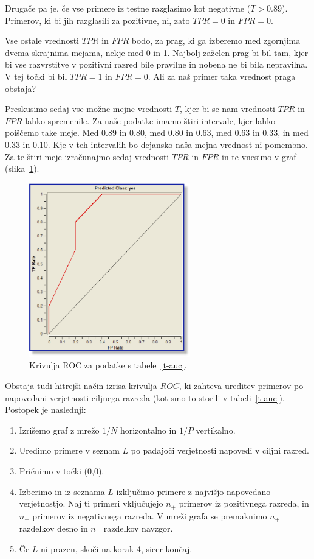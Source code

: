 Drugače pa je, če vse primere iz testne razglasimo kot negativne ($T>0.89$). Primerov, ki bi jih razglasili za pozitivne, ni, zato $TPR=0$ in $FPR=0$.

Vse ostale vrednosti $TPR$ in $FPR$ bodo, za prag, ki ga izberemo med zgornjima dvema skrajnima mejama, nekje med 0 in 1. Najbolj zaželen prag bi bil tam, kjer bi vse razvrstitve v pozitivni razred bile pravilne in nobena ne bi bila nepravilna. V tej točki bi bil $TPR=1$ in $FPR=0$. Ali za naš primer taka vrednost praga obstaja?

Preskusimo sedaj vse možne mejne vrednosti $T$, kjer bi se nam vrednosti $TPR$ in $FPR$ lahko spremenile. Za naše podatke imamo štiri intervale, kjer lahko poiščemo take meje. Med 0.89 in 0.80, med 0.80 in 0.63, med 0.63 in 0.33, in med 0.33 in 0.10. Kje v teh intervalih bo dejansko naša mejna vrednost ni pomembno. Za te štiri meje izračunajmo sedaj vrednosti $TPR$ in $FPR$ in te vnesimo v graf (slika~\ref{f-roc}).

\begin{figure}[htbp]
\begin{center}
\includegraphics[width=7cm]{slike/roc.png}
\caption{Krivulja ROC za podatke s tabele~\ref{t-auc}.}
\label{f-roc}
\end{center}
\end{figure}

Obstaja tudi hitrejši način izrisa krivulja $ROC$, ki zahteva ureditev primerov po napovedani verjetnosti ciljnega razreda (kot smo to storili v tabeli~\ref{t-auc}). Postopek je naslednji:
%
\begin{enumerate}
\item Izrišemo graf z mrežo $1/N$ horizontalno in $1/P$ vertikalno.
\item Uredimo primere v seznam $L$ po padajoči verjetnosti napovedi v ciljni razred.
\item Pričnimo v točki (0,0).
\item Izberimo in iz seznama $L$ izključimo primere z najvišjo napovedano verjetnostjo. Naj ti primeri vključujejo $n_+$ primerov iz pozitivnega razreda, in $n_-$ primerov iz negativnega razreda. V mreži grafa se premaknimo $n_+$ razdelkov desno in $n_-$ razdelkov navzgor.
\item Če $L$ ni prazen, skoči na korak 4, sicer končaj.
\end{enumerate}

